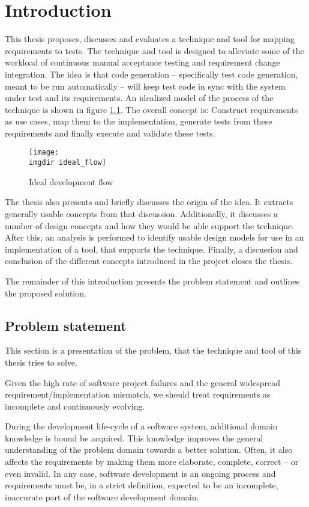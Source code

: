 \chapter{Introduction}
This thesis proposes, discusses and evaluates a technique and tool for mapping requirements to tests. The technique and tool is designed to alleviate some of the workload of continuous manual acceptance testing and requirement change integration. The idea is that code generation -- specifically test code generation, meant to be run automatically -- will keep test code in sync with the system under test and its requirements.  An idealized model of the process of the technique is shown in figure \ref{fig:ideal_flow}. The overall concept is: Construct requirements as use cases, map them to the implementation, generate tests from these requirements and finally execute and validate these tests.\medskip

\begin{figure}[!htbp]
\centering
\texttt{[image: \\imgdir ideal\_flow]}
\caption{Ideal development flow}
\label{fig:ideal_flow}
\end{figure}

\noindent
The thesis also presents and briefly discusses the origin of the idea. It extracts generally usable concepts from that discussion. Additionally, it discusses a number of design concepts and how they would be able support the technique. After this, an analysis is performed to identify usable design models for use in an implementation of a tool, that supports the technique. Finally, a discussion and conclusion of the different concepts introduced in the project closes the thesis.\medskip

\noindent
The remainder of this introduction presents the problem statement and outlines the proposed solution.

\section{Problem statement}
This section is a presentation of the problem, that the technique and tool of this thesis tries to solve.\medskip

\noindent
Given the high rate of software project failures\cite{verner2008} \cite{charette2005} and the general widespread requirement/implementation mismatch, we should treat requirements as incomplete and continuously evolving.\medskip

During the development life-cycle of a software system, additional domain knowledge is bound be acquired. This knowledge improves the general understanding of the problem domain towards a better solution. Often, it also affects the requirements by making them more elaborate, complete, correct -- or even invalid. In any case, software development is an ongoing process and requirements must be, in a strict definition, expected to be an incomplete, inaccurate part of the software development domain.\medskip

